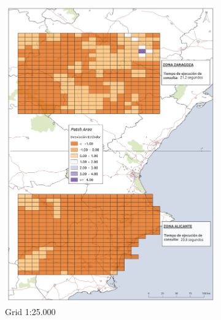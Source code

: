 \begin{figure}
  \centering
  \begin{subfigure}[b]{0.4\textwidth}
    \includegraphics[width=\textwidth]{ResultadosyDiscusion/Figs/Results/p_25.pdf}
    \caption{Grid 1:25.000}
    \label{fig:p_25}   
  \end{subfigure}             
  \begin{subfigure}[b]{0.4\textwidth}

\end{subfigure}
\end{figure}
